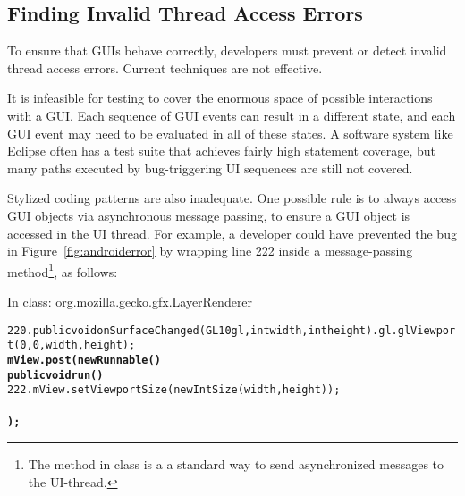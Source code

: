 


\subsection{Finding Invalid Thread Access Errors}
\label{sec:finding}

To ensure that GUIs behave correctly, developers must prevent or detect invalid thread
access errors. Current techniques are not effective. %

It is infeasible for testing to cover the enormous space of possible interactions
with a GUI. Each sequence of GUI events can result in
a different state, and each GUI event may need to be evaluated in all of
these states. A  software system like Eclipse
often has a test suite that achieves fairly high statement coverage,
but many paths executed by bug-triggering UI sequences are still not covered.

Stylized coding patterns are also inadequate. One possible rule is to always
access GUI objects via asynchronous message passing, to ensure a GUI object is accessed in
the UI thread. For example, a developer could have prevented the bug in Figure~\ref{fig:androiderror}
by wrapping line 222 inside a  message-passing method\footnote{The
 method in class  is a
a standard way to send asynchronized messages to the UI-thread.}, as follows:

{\vspace{2mm}
\hspace{3mm}\small{In class: org.mozilla.gecko.gfx.LayerRenderer}
\vspace{-2mm}
\begin{CodeOut}
\begin{alltt}
220. public void onSurfaceChanged(GL10 gl, int width, int height) .     gl.glViewport(0, 0, width, height);
         \textbf{mView.post(new Runnable() \ttlcb}
             \textbf{public void run() \ttlcb}
222.             mView.setViewportSize(new IntSize(width, height));
             \textbf{\ttrcb}
         \textbf{\ttrcb);}
     \ttrcb
\end{alltt}
\end{CodeOut}}

